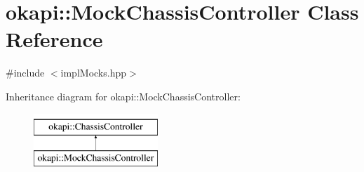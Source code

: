 \hypertarget{classokapi_1_1MockChassisController}{}\section{okapi\+::Mock\+Chassis\+Controller Class Reference}
\label{classokapi_1_1MockChassisController}


{\ttfamily \#include $<$impl\+Mocks.\+hpp$>$}

Inheritance diagram for okapi\+::Mock\+Chassis\+Controller\+:\begin{figure}[H]
\begin{center}
\leavevmode
\includegraphics[height=2.000000cm]{classokapi_1_1MockChassisController}
\end{center}
\end{figure}
